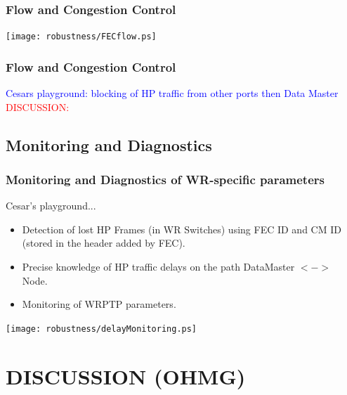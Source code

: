 \documentclass[]{beamer}
\begin{document}
\begin{frame}
  \frametitle{Flow and Congestion Control }
\centering
\texttt{[image: robustness/FECflow.ps]}

\end{frame}


\begin{frame}
  \frametitle{Flow and Congestion Control}   

\textcolor{blue}{Cesars playground: blocking of HP traffic from other ports then
Data Master}
\centering
\textcolor{red}{DISCUSSION:} 

\end{frame}

\subsection{Monitoring and Diagnostics}
\begin{frame}
  \frametitle{Monitoring and Diagnostics of WR-specific parameters}   

Cesar's playground...
\begin{itemize}
 \item Detection of lost HP Frames (in WR Switches) using FEC ID and CM ID
      (stored in the header added by FEC).
 \item Precise knowledge of HP traffic delays on the path DataMaster $<->$ Node.
 \item Monitoring of WRPTP parameters.
\end{itemize}
\centering
\texttt{[image: robustness/delayMonitoring.ps]}

\end{frame}

\section{DISCUSSION (OHMG)}
\end{document}
